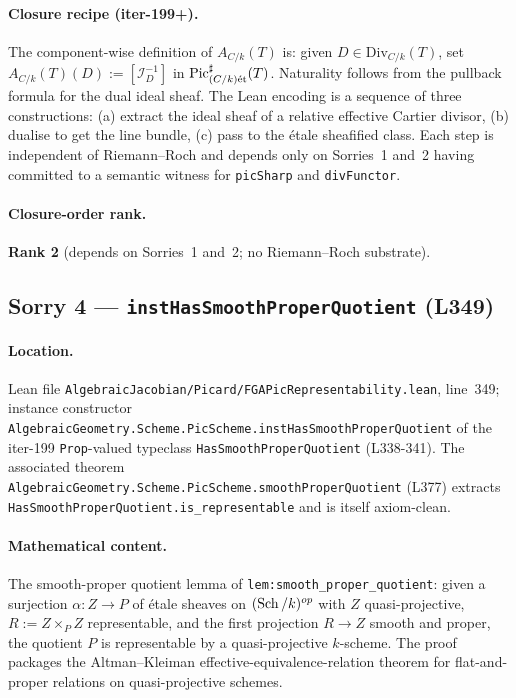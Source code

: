\paragraph{Closure recipe (iter-199+).} The component-wise definition
of $A_{C/k}(T)$ is: given $D \in \mathrm{Div}_{C/k}(T)$, set
$A_{C/k}(T)(D) := [\mathcal{I}_D^{-1}]$ in
$\operatorname{Pic}^\sharp_{(C/k)\mathrm{\acute{e}t}}(T)$. Naturality follows from the pullback
formula for the dual ideal sheaf. The Lean encoding is a sequence of
three constructions: (a) extract the ideal sheaf of a relative
effective Cartier divisor, (b) dualise to get the line bundle,
(c) pass to the \'etale sheafified class. Each step is independent of
Riemann--Roch and depends only on Sorries~1 and~2 having committed to
a semantic witness for \texttt{picSharp} and \texttt{divFunctor}.

\paragraph{Closure-order rank.} \textbf{Rank 2} (depends on Sorries~1
and~2; no Riemann--Roch substrate).

\subsection{Sorry 4 --- \texttt{instHasSmoothProperQuotient} (L349)}
\label{subsec:sorry_smooth_proper_quotient}

\paragraph{Location.} Lean file
\texttt{AlgebraicJacobian/Picard/FGAPicRepresentability.lean},
line~349; instance constructor
\texttt{AlgebraicGeometry.Scheme.PicScheme.instHasSmoothProperQuotient}
of the iter-199 \texttt{Prop}-valued typeclass
\texttt{HasSmoothProperQuotient} (L338-341). The associated theorem
\texttt{AlgebraicGeometry.Scheme.PicScheme.smoothProperQuotient}
(L377) extracts \texttt{HasSmoothProperQuotient.is\_representable}
and is itself axiom-clean.

\paragraph{Mathematical content.} The smooth-proper quotient lemma
of \texttt{lem:smooth_proper_quotient}: given a surjection
$\alpha : Z \to P$ of \'etale sheaves on $(\operatorname{Sch}/k)^{op}$ with $Z$
quasi-projective, $R := Z \times_P Z$ representable, and the first
projection $R \to Z$ smooth and proper, the quotient $P$ is
representable by a quasi-projective $k$-scheme. The proof packages
the Altman--Kleiman effective-equivalence-relation theorem for
flat-and-proper relations on quasi-projective schemes.

